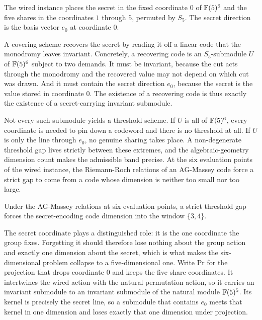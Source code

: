 \begin{definition}
  \label{def:wired_s5}
  \rocqok
  The wired instance places the secret in the fixed coordinate $0$ of
  $\mathbb{F}(5)^6$ and the five shares in the coordinates $1$ through $5$, permuted by
  $S_5$. The secret direction is the basis vector $e_0$ at coordinate $0$.
\end{definition}

A covering scheme recovers the secret by reading it off a linear code that the
monodromy leaves invariant. Concretely, a recovering code is an $S_5$-submodule
$U$ of $\mathbb{F}(5)^6$ subject to two demands. It must be invariant, because the cut
acts through the monodromy and the recovered value may not depend on which cut
was drawn. And it must contain the secret direction $e_0$, because the secret is
the value stored in coordinate $0$. The existence of a recovering code is thus
exactly the existence of a secret-carrying invariant submodule.

Not every such submodule yields a threshold scheme. If $U$ is all of
$\mathbb{F}(5)^6$, every coordinate is needed to pin down a codeword and there is no
threshold at all. If $U$ is only the line through $e_0$, no genuine sharing takes
place. A non-degenerate threshold gap lives strictly between these extremes, and
the algebraic-geometry dimension count makes the admissible band precise. At the
six evaluation points of the wired instance, the Riemann-Roch relations of an
AG-Massey code force a strict gap to come from a code whose dimension is neither
too small nor too large.

\begin{definition}
  \label{def:gap_window}
  \rocqok
  Under the AG-Massey relations at six evaluation points, a strict threshold gap
  forces the secret-encoding code dimension into the window $\{3,4\}$.
\end{definition}

The secret coordinate plays a distinguished role: it is the one coordinate the
group fixes. Forgetting it should therefore lose nothing about the group action
and exactly one dimension about the secret, which is what makes the
six-dimensional problem collapse to a five-dimensional one. Write $\mathrm{Pr}$
for the projection that drops coordinate $0$ and keeps the five share
coordinates. It intertwines the wired action with the natural permutation action,
so it carries an invariant submodule to an invariant submodule of the natural
module $\mathbb{F}(5)^5$. Its kernel is precisely the secret line, so a submodule that
contains $e_0$ meets that kernel in one dimension and loses exactly that one
dimension under projection.

